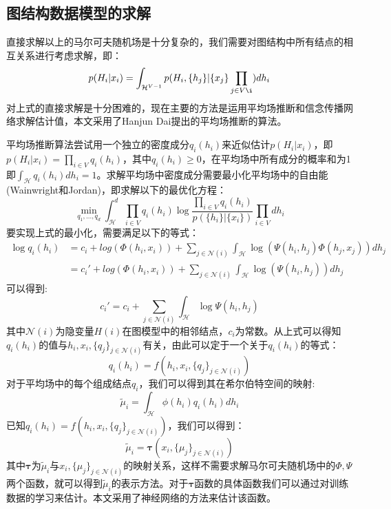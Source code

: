 \subsection{图结构数据模型的求解}
直接求解以上的马尔可夫随机场是十分复杂的，我们需要对图结构中所有结点的相互关系进行考虑求解，即：
\begin{equation*}
p(H_i|{x_i}) = \int_{\mathcal{H}^{V-1}} p(H_i, \{h_j\}| \{x_j\}\prod_{j\in V\i})dh_i
\end{equation*}
对上式的直接求解是十分困难的，现在主要的方法是运用平均场推断和信念传播网络求解估计值，本文采用了Hanjun Dai\cite{dai2016discriminative}提出的平均场推断的算法。
\par 平均场推断算法尝试用一个独立的密度成分$q_i(h_i)$来近似估计$p(H_i|{x_i})$，即$p(H_i|{x_i})=\prod_{i\in V} q_i(h_i)$，其中$q_i(h_i)\ge 0$，在平均场中所有成分的概率和为1即$\int_\mathcal{H} q_i(h_i)dh_i=1$。求解平均场中密度成分需要最小化平均场中的自由能(Wainwright和Jordan\cite{wainwright2008graphical})，即求解以下的最优化方程：
\begin{equation*}
\min_{q_1, ..., q_d} \int_\mathcal{H}^d \prod_{i\in V}q_i(h_i)\log \frac{\prod_{i\in V}q_i(h_i)}{p(\{h_i\}|\{x_i\})}\prod_{i\in V}dh_i
\end{equation*}
要实现上式的最小化，需要满足以下的等式：
\begin{align*}
\log q_i(h_i) &= c_i + log( \Phi(h_i, x_i)) + \sum_{j\in \mathcal{N}(i)} \int_\mathcal{H}\log (\Psi(h_i, h_j) \Phi(h_j, x_j))dh_j\\
&={c_i}'+ log( \Phi(h_i, x_i)) + \sum_{j\in \mathcal{N}(i)} \int_\mathcal{H}\log (\Psi(h_i, h_j))dh_j
\end{align*}
可以得到:
$$c_i' = c_i + \sum_{j\in \mathcal{N}(i)} \int_\mathcal{H}\log \Psi(h_i, h_j)  $$
其中$\mathcal{N}(i)$为隐变量$H(i)$在图模型中的相邻结点，$c_i$为常数。从上式可以得知$q_i(h_i)$的值与$h_i, x_i, \{q_j\}_{j\in \mathcal{N}(i)}$有关，由此可以定于一个关于$q_i(h_i)$的等式：
\begin{equation*}
q_i(h_i) =  f(h_i, x_i,  \{q_j\}_{j\in \mathcal{N}(i)})
\end{equation*}
对于平均场中的每个组成结点$q_i$，我们可以得到其在希尔伯特空间的映射:
\begin{equation*}
\tilde{\mu}_i = \int_{\mathcal{H}} \phi(h_i)q_i(h_i)dh_i
\end{equation*}
已知$q_i(h_i) =  f(h_i, x_i,  \{q_j\}_{j\in \mathcal{N}(i)})$，我们可以得到：
\begin{equation*}
\tilde{\mu}_i = \boldsymbol{\tau} (x_i, \{\mu_j\}_{j\in \mathcal{N}(i)})
\end{equation*}
其中$\boldsymbol{\tau}$为$\tilde{\mu}_i$与$x_i, \{\mu_j\}_{j\in \mathcal{N}(i)}$的映射关系，这样不需要求解马尔可夫随机场中的$\Phi, \Psi$两个函数，就可以得到$\tilde{\mu}_i$的表示方法。对于$\boldsymbol{\tau}$函数的具体函数我们可以通过对训练数据的学习来估计。本文采用了神经网络的方法来估计该函数。
